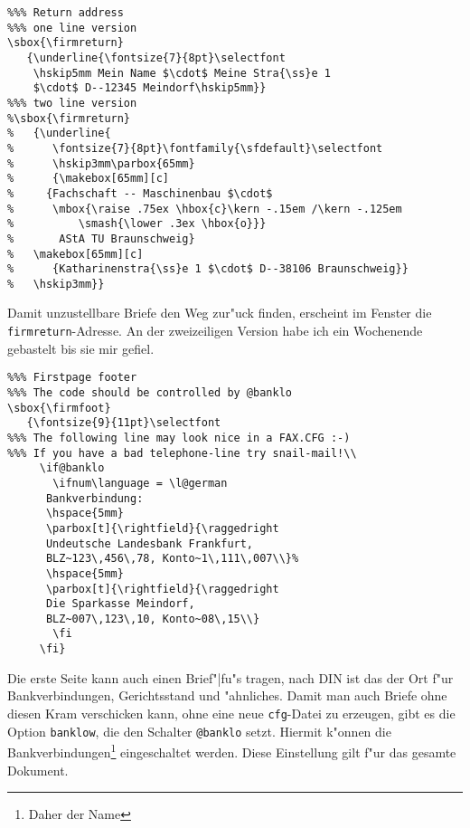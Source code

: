 \documentclass[a4paper]{article}
\begin{document}
\begin{verbatim}
%%% Return address
%%% one line version
\sbox{\firmreturn}
   {\underline{\fontsize{7}{8pt}\selectfont
    \hskip5mm Mein Name $\cdot$ Meine Stra{\ss}e 1
    $\cdot$ D--12345 Meindorf\hskip5mm}}
%%% two line version
%\sbox{\firmreturn}
%   {\underline{
%      \fontsize{7}{8pt}\fontfamily{\sfdefault}\selectfont
%      \hskip3mm\parbox{65mm}
%      {\makebox[65mm][c]
%	  {Fachschaft -- Maschinenbau $\cdot$
%	   \mbox{\raise .75ex \hbox{c}\kern -.15em /\kern -.125em
%	       \smash{\lower .3ex \hbox{o}}}
%		AStA TU Braunschweig}
%	\makebox[65mm][c]
%	   {Katharinenstra{\ss}e 1 $\cdot$ D--38106 Braunschweig}}
%   \hskip3mm}}
\end{verbatim}

Damit unzustellbare Briefe den Weg zur"uck finden, erscheint im 
Fenster die \texttt{firmreturn}-Adresse. An der zweizeiligen 
Version habe ich ein Wochenende gebastelt bis sie mir gefiel.

\begin{verbatim}
%%% Firstpage footer
%%% The code should be controlled by @banklo
\sbox{\firmfoot}
   {\fontsize{9}{11pt}\selectfont
%%% The following line may look nice in a FAX.CFG :-)
%%% If you have a bad telephone-line try snail-mail!\\
     \if@banklo
       \ifnum\language = \l@german
	  Bankverbindung:
	  \hspace{5mm}
	  \parbox[t]{\rightfield}{\raggedright
	  Undeutsche Landesbank Frankfurt,
	  BLZ~123\,456\,78, Konto~1\,111\,007\\}%
	  \hspace{5mm}
	  \parbox[t]{\rightfield}{\raggedright
	  Die Sparkasse Meindorf,
	  BLZ~007\,123\,10, Konto~08\,15\\}
       \fi
     \fi}
\end{verbatim}

Die erste Seite kann auch einen Brief"|fu"s tragen, nach DIN ist 
das der Ort f"ur Bankverbindungen, Gerichtsstand und "ahnliches. 
Damit man auch Briefe ohne diesen Kram verschicken kann, ohne 
eine neue \texttt{cfg}-Datei zu erzeugen, gibt es die Option 
\texttt{banklow}, die den Schalter \verb+@banklo+ setzt. Hiermit 
k"onnen die Bankverbindungen\footnote{Daher der Name} 
eingeschaltet werden. Diese Einstellung gilt f"ur das gesamte 
Dokument.
\end{document}
